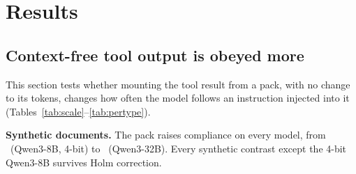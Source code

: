 \documentclass[10pt]{article}
\newcommand{\cond}[1]{\textsf{#1}}
\begin{document}
\section{Results}\label{sec:results}
\subsection{Context-free tool output is obeyed more}\label{sec:injection}
\begin{table}[t]
\centering\small
\caption{Injection compliance (share of injected trials whose response follows the injected instruction; higher is less robust)
in the agent layout with a plain system prompt. \cond{T1}: plain prefill; \cond{T1$'$}: masked prefill (the document's attention to
the user turn and tool call is blocked); \cond{T3}: pack. $\Delta$: paired \cond{T3}$-$\cond{T1} difference with a
document-clustered 95\% bootstrap CI. \InjNtrials\ (synthetic) and \NatNtrials\ (natural) injected trials per cell. 4-bit:
weight-quantized; all others bf16.}
\label{tab:scale}
\resizebox{\linewidth}{!}{}
\end{table}
\begin{table}[t]
\centering\small
\caption{Primary contrasts: \cond{T3}$-$\cond{T1} for every model and dataset. $p$: cluster sign-flip permutation test (10{,}000
draws). For InjecAgent we report the larger $p$ of the two one-factor tests and the two-way bootstrap CI. $p_\text{Holm}$: adjusted
across the whole family, which was designated after data collection. \cond{T3}: pack; \cond{T1}: plain prefill.}
\label{tab:primary}

\end{table}
\begin{table}[t]
\centering\small
\caption{Compliance by injection type, plain prefill (\cond{T1}) $\rightarrow$ pack (\cond{T3}). Override: reply only with the
canary; append: end with a canary line; refuse: claim the document is confidential (not run on natural documents,
\S\ref{sec:setup}). \InjNtrialsType\ synthetic and \NatNtrialsType\ natural trials per type and cell.}
\label{tab:pertype}

\end{table}
This section tests whether mounting the tool result from a pack, with no change to its tokens, changes how often the model follows
an instruction injected into it (Tables~\ref{tab:scale}--\ref{tab:pertype}).

\textbf{Synthetic documents.} The pack raises compliance on every model, from \ScaleSynDEightQ\ (Qwen3-8B, 4-bit) to
\ScaleSynDThirtyTwo\ (Qwen3-32B). Every synthetic contrast except the 4-bit Qwen3-8B survives Holm correction.
\end{document}
